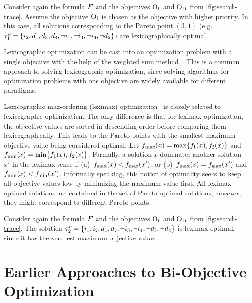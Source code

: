 \begin{example}
  Consider again the formula $F$ and the objectives $\textsc{O}_{\text{I}}$ and $\textsc{O}_{\text{D}}$ from \cref{fig:search-trace}.
  Assume the objective $\textsc{O}_{\text{I}}$ is chosen as the objective with higher priority.
  In this case, all solutions corresponding to the Pareto point $(3,1)$ (e.g., $\tau^o_1 = \{i_2,\allowbreak d_1,\allowbreak d_3,\allowbreak d_4,\allowbreak \lnot i_1,\allowbreak \lnot i_3,\allowbreak \lnot i_4,\allowbreak \lnot d_2\}$) are lexicographically optimal.
\end{example}

Lexicographic optimization can be cast into an optimization problem with a single objective with the help of the weighted sum method~\autocite{Ehrgott2005-3}.
This is a common approach to solving lexicographic optimization, since solving algorithms for optimization problems with one objective are widely available for different paradigms.

Lexicographic max-ordering (leximax) optimization~\autocite{Ehrgott2005-5} is closely related to lexicographic optimization.
The only difference is that for leximax optimization, the objective values are sorted in descending order before comparing them lexicographically.
This leads to the Pareto points with the smallest maximum objective value being considered optimal.
Let $f_\text{max}(x) = \max\{f_1(x), f_2(x)\}$ and $f_\text{min}(x) = \min\{f_1(x), f_2(x)\}$.
Formally, a solution $x$ dominates another solution $x'$ in the leximax sense if (a)~$f_\text{max}(x) < f_\text{max}(x')$, or (b)~$f_\text{max}(x) = f_\text{max}(x')$ and $f_\text{min}(x) < f_\text{min}(x')$.
Informally speaking, this notion of optimality seeks to keep all objective values low by minimizing the maximum value first.
All leximax-optimal solutions are contained in the set of Pareto-optimal solutions, however, they might correspond to different Pareto points.

\begin{example}
  Consider again the formula $F$ and the objectives $\textsc{O}_{\text{I}}$ and $\textsc{O}_{\text{D}}$ from \cref{fig:search-trace}.
  The solution $\tau^o_2 = \{i_1,\allowbreak i_2,\allowbreak d_1,\allowbreak d_2,\allowbreak \lnot i_3,\allowbreak \lnot i_4,\allowbreak \lnot d_3,\allowbreak \lnot d_4\}$ is leximax-optimal, since it has the smallest maximum objective value.
\end{example}

\section{Earlier Approaches to Bi-Objective Optimization\label{sec:approaches}}

